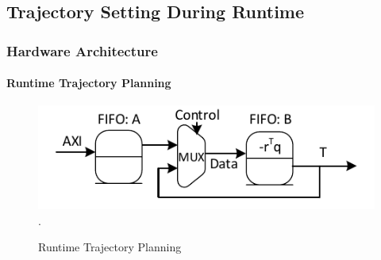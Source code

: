 \documentclass{beamer}
\begin{document}
\subsection{Trajectory Setting During Runtime}
\begin{frame}
\frametitle{Hardware Architecture}
\framesubtitle{Runtime Trajectory Planning}
\begin{figure}[t]
\centering
\captionsetup{justification=centering}
\includegraphics[scale=.75]{../ASAP_17/figure/trajectoryProfile.pdf}
\DeclareGraphicsExtensions.
\caption{Runtime Trajectory Planning\label{fig_traj}}
\end{figure}
\end{frame}
\end{document}
